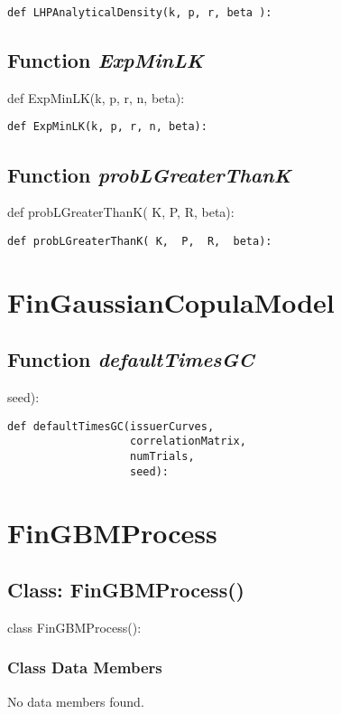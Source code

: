 \documentclass[twoside,11pt]{book}
\begin{document}
\begin{lstlisting}
def LHPAnalyticalDensity(k, p, r, beta ):
\end{lstlisting}

\subsection{Function {\it ExpMinLK}}
def ExpMinLK(k, p, r, n, beta):

\begin{lstlisting}
def ExpMinLK(k, p, r, n, beta):
\end{lstlisting}

\subsection{Function {\it probLGreaterThanK}}
def probLGreaterThanK( K,  P,  R,  beta):

\begin{lstlisting}
def probLGreaterThanK( K,  P,  R,  beta):
\end{lstlisting}

\newpage
\section{FinGaussianCopulaModel}

\subsection{Function {\it defaultTimesGC}}
seed):

\begin{lstlisting}
def defaultTimesGC(issuerCurves, 
                   correlationMatrix, 
                   numTrials, 
                   seed):
\end{lstlisting}

\newpage
\section{FinGBMProcess}

\subsection{Class: FinGBMProcess()}
class FinGBMProcess():

\subsubsection{Class Data Members}
No data members found.
\end{document}
